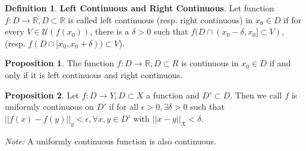 \documentclass{article}
\theoremstyle{definition}
\newtheorem{defi}{Definition}[subsection]
\newtheorem{prop}{Proposition}[subsection]
\begin{document}
\begin{defi}
\textbf{Left Continuous and Right Continuous}. Let function $f: D\to \mathbb{R}, D\subset \mathbb{R}$ is called left continuous (resp. right continuous) in $x_0\in D$ if for every $V\in\mathcal{U}(f(x_0))$, there is a $\delta>0$ such that $f(D\cap (x_0-\delta, x_0]\subset V)$, (resp. $f(D\cap [x_0, x_0+\delta))\subset V$).
\end{defi}
\begin{prop}
The function $f: D\to\mathbb{R}, D\subset R$ is continuous in $x_0\in D$ if and only if it is left continuous and right continuous.
\end{prop}
\begin{prop}
Let $f: D\to Y, D\subset X$ a function and $D' \subset D$. Then we call $f$ is uniformly continuous on $D'$ if for all $\epsilon>0, \exists \delta>0$ such that $||f(x)-f(y)||_y<\epsilon, \forall x,y \in D'$ with $||x-y||_X<\delta$.
\end{prop}
\textit{Note:} A uniformly continuous function is also continuous.
\end{document}

